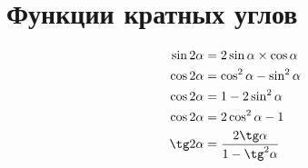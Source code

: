\documentclass[a4paper,12pt]{article}
\begin{document}
\section{Функции кратных углов}

\begin{align*}
\sin2\alpha &= 2\sin\alpha \times \cos\alpha \\
\cos2\alpha &= \cos^2\alpha - \sin^2\alpha \\
\cos2\alpha &= 1 - 2\sin^2\alpha \\
\cos2\alpha &= 2\cos^2\alpha - 1 \\
\tg2\alpha &= \frac{2\tg\alpha}{1 - \tg^2\alpha}
\end{align*}
\end{document}
